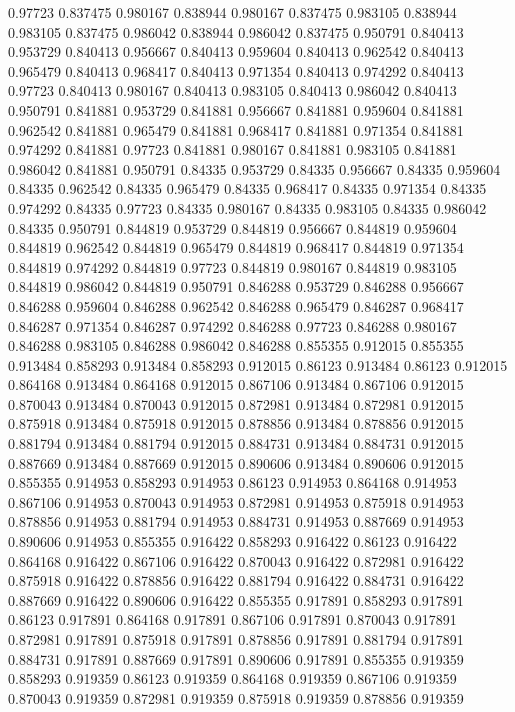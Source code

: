 0.97723 0.837475
0.980167 0.838944
0.980167 0.837475
0.983105 0.838944
0.983105 0.837475
0.986042 0.838944
0.986042 0.837475
0.950791 0.840413
0.953729 0.840413
0.956667 0.840413
0.959604 0.840413
0.962542 0.840413
0.965479 0.840413
0.968417 0.840413
0.971354 0.840413
0.974292 0.840413
0.97723 0.840413
0.980167 0.840413
0.983105 0.840413
0.986042 0.840413
0.950791 0.841881
0.953729 0.841881
0.956667 0.841881
0.959604 0.841881
0.962542 0.841881
0.965479 0.841881
0.968417 0.841881
0.971354 0.841881
0.974292 0.841881
0.97723 0.841881
0.980167 0.841881
0.983105 0.841881
0.986042 0.841881
0.950791 0.84335
0.953729 0.84335
0.956667 0.84335
0.959604 0.84335
0.962542 0.84335
0.965479 0.84335
0.968417 0.84335
0.971354 0.84335
0.974292 0.84335
0.97723 0.84335
0.980167 0.84335
0.983105 0.84335
0.986042 0.84335
0.950791 0.844819
0.953729 0.844819
0.956667 0.844819
0.959604 0.844819
0.962542 0.844819
0.965479 0.844819
0.968417 0.844819
0.971354 0.844819
0.974292 0.844819
0.97723 0.844819
0.980167 0.844819
0.983105 0.844819
0.986042 0.844819
0.950791 0.846288
0.953729 0.846288
0.956667 0.846288
0.959604 0.846288
0.962542 0.846288
0.965479 0.846287
0.968417 0.846287
0.971354 0.846287
0.974292 0.846288
0.97723 0.846288
0.980167 0.846288
0.983105 0.846288
0.986042 0.846288
0.855355 0.912015
0.855355 0.913484
0.858293 0.913484
0.858293 0.912015
0.86123 0.913484
0.86123 0.912015
0.864168 0.913484
0.864168 0.912015
0.867106 0.913484
0.867106 0.912015
0.870043 0.913484
0.870043 0.912015
0.872981 0.913484
0.872981 0.912015
0.875918 0.913484
0.875918 0.912015
0.878856 0.913484
0.878856 0.912015
0.881794 0.913484
0.881794 0.912015
0.884731 0.913484
0.884731 0.912015
0.887669 0.913484
0.887669 0.912015
0.890606 0.913484
0.890606 0.912015
0.855355 0.914953
0.858293 0.914953
0.86123 0.914953
0.864168 0.914953
0.867106 0.914953
0.870043 0.914953
0.872981 0.914953
0.875918 0.914953
0.878856 0.914953
0.881794 0.914953
0.884731 0.914953
0.887669 0.914953
0.890606 0.914953
0.855355 0.916422
0.858293 0.916422
0.86123 0.916422
0.864168 0.916422
0.867106 0.916422
0.870043 0.916422
0.872981 0.916422
0.875918 0.916422
0.878856 0.916422
0.881794 0.916422
0.884731 0.916422
0.887669 0.916422
0.890606 0.916422
0.855355 0.917891
0.858293 0.917891
0.86123 0.917891
0.864168 0.917891
0.867106 0.917891
0.870043 0.917891
0.872981 0.917891
0.875918 0.917891
0.878856 0.917891
0.881794 0.917891
0.884731 0.917891
0.887669 0.917891
0.890606 0.917891
0.855355 0.919359
0.858293 0.919359
0.86123 0.919359
0.864168 0.919359
0.867106 0.919359
0.870043 0.919359
0.872981 0.919359
0.875918 0.919359
0.878856 0.919359
